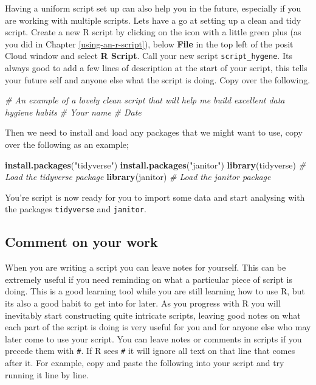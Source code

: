 \documentclass[
]{book}
\newenvironment{Shaded}{\begin{snugshade}}{\end{snugshade}}
\newcommand{\CommentTok}[1]{\textcolor[rgb]{0.56,0.35,0.01}{\textit{#1}}}
\newcommand{\FunctionTok}[1]{\textcolor[rgb]{0.13,0.29,0.53}{\textbf{#1}}}
\newcommand{\NormalTok}[1]{#1}
\newcommand{\StringTok}[1]{\textcolor[rgb]{0.31,0.60,0.02}{#1}}
\begin{document}
Having a uniform script set up can also help you in the future, especially if you are working with multiple scripts. Lets have a go at setting up a clean and tidy script.
Create a new R script by clicking on the icon with a little green plus (as you did in Chapter \ref{using-an-r-script}), below \textbf{File} in the top left of the posit Cloud window and select \textbf{R Script}. Call your new script \texttt{script\_hygene}. Its always good to add a few lines of description at the start of your script, this tells your future self and anyone else what the script is doing. Copy over the following.

\begin{Shaded}
\begin{Highlighting}[]
\CommentTok{\# An example of a lovely clean script that will help me build excellent data hygiene habits}
\CommentTok{\# Your name}
\CommentTok{\# Date}
\end{Highlighting}
\end{Shaded}

Then we need to install and load any packages that we might want to use, copy over the following as an example;

\begin{Shaded}
\begin{Highlighting}[]
\FunctionTok{install.packages}\NormalTok{(}\StringTok{"tidyverse"}\NormalTok{)}
\FunctionTok{install.packages}\NormalTok{(}\StringTok{"janitor"}\NormalTok{)}
\FunctionTok{library}\NormalTok{(tidyverse) }\CommentTok{\# Load the tidyverse package}
\FunctionTok{library}\NormalTok{(janitor) }\CommentTok{\# Load the janitor package}
\end{Highlighting}
\end{Shaded}

You're script is now ready for you to import some data and start analysing with the packages \texttt{tidyverse} and \texttt{janitor}.

\hypertarget{comment-on-your-work}{%
\subsection{Comment on your work}\label{comment-on-your-work}}

When you are writing a script you can leave notes for yourself. This can be extremely useful if you need reminding on what a particular piece of script is doing. This is a good learning tool while you are still learning how to use R, but its also a good habit to get into for later. As you progress with R you will inevitably start constructing quite intricate scripts, leaving good notes on what each part of the script is doing is very useful for you and for anyone else who may later come to use your script. You can leave notes or comments in scripts if you precede them with \texttt{\#}. If R sees \texttt{\#} it will ignore all text on that line that comes after it. For example, copy and paste the following into your script and try running it line by line.
\end{document}
